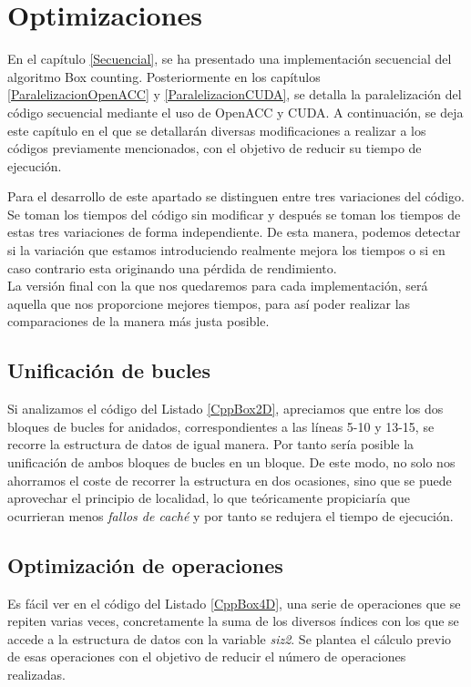 \chapter{Optimizaciones}

En el capítulo \ref{Secuencial}, se ha presentado una implementación secuencial del algoritmo Box counting. Posteriormente en los capítulos \ref{ParalelizacionOpenACC} y \ref{ParalelizacionCUDA}, se detalla la paralelización del código secuencial mediante el uso de OpenACC y CUDA. A continuación, se deja este capítulo en el que se detallarán diversas modificaciones a realizar a los códigos previamente mencionados, con el objetivo de reducir su tiempo de ejecución. 

Para el desarrollo de este apartado se distinguen entre tres variaciones del código. Se toman los tiempos del código sin modificar y después se toman los tiempos de estas tres variaciones de forma independiente. De esta manera, podemos detectar si la variación que estamos introduciendo realmente mejora los tiempos o si en caso contrario esta originando una pérdida de rendimiento. \\

La versión final con la que nos quedaremos para cada implementación, será aquella que nos proporcione mejores tiempos, para así poder realizar las comparaciones de la manera más justa posible.

\section{Unificación de bucles}
Si analizamos el código del Listado \ref{CppBox2D}, apreciamos que entre los dos bloques de bucles for anidados, correspondientes a las líneas 5-10 y 13-15, se recorre la estructura de datos de igual manera. Por tanto sería posible la unificación de ambos bloques de bucles en un bloque. De este modo, no solo nos ahorramos el coste de recorrer la estructura en dos ocasiones, sino que se puede aprovechar el principio de localidad, lo que teóricamente propiciaría que ocurrieran menos \textit{fallos de caché} y por tanto se redujera el tiempo de ejecución.
\section{Optimización de operaciones}
Es fácil ver en el código del Listado \ref{CppBox4D}, una serie de operaciones que se repiten varias veces, concretamente la suma de los diversos índices con los que se accede a la estructura de datos con la variable \textit{siz2}. Se plantea el cálculo previo de esas operaciones con el objetivo de reducir el número de operaciones realizadas.

